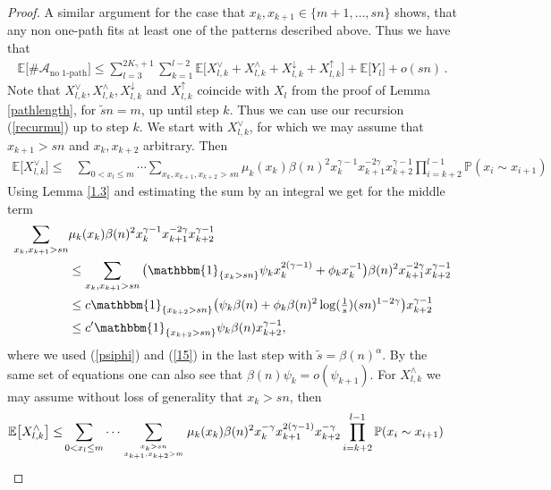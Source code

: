 \documentclass[12pt,a4paper]{article}
\numberwithin{equation}{section}
\begin{document}
\begin{proof}
    A similar argument for the case that $x_k,x_{k+1}\in\{m+1,\dots,sn\}$ shows, that any non one-path fits at least one of the patterns described above. Thus we have that 
    \begin{align}\label{anop}
       \mathbb E\big[ \#\mathcal A_{\text{no 1-path}}\big] \le \sum_{l=3}^{2K_\gamma+1}\sum_{k=1}^{l-2}\mathbb E\big[X_{l,k}^{\vee}+X_{l,k}^{\wedge}+X_{l,k}^{\downarrow}+X_{l,k}^{\uparrow}\big]+\mathbb E\big[Y_l\big]+o(sn)\,.
    \end{align}
    Note that $X_{l,k}^{\vee},X_{l,k}^{\wedge},X_{l,k}^{\downarrow}$ and $X_{l,k}^{\uparrow}$ coincide with $X_l$ from the proof of Lemma \ref{pathlength}, for $\tilde sn=m$, up until step $k$.  
    Thus we can use our recursion (\ref{recurmu}) up to step $k$. We start with $X_{l,k}^{\vee}$, for which we may assume that $x_{k+1}>sn$ and $x_k,x_{k+2}$ arbitrary. Then
    \begin{align*}
       \mathbb E\big[X_{l,k}^{\vee}\big]\le &\sum_{0<x_l\le m} \cdots \sum_{x_k,x_{k+1},x_{k+2}>sn} \mu_k(x_k)\beta(n)^2x_k^{\gamma-1}x_{k+1}^{-2\gamma}x_{k+2}^{\gamma-1}\prod_{i=k+2}^{l-1} \mathbb P (x_i\sim x_{i+1})
    \end{align*}
    Using Lemma \ref{1.3} and estimating the sum by an integral we get for the middle term
    \begin{align*}
        \sum_{x_k,x_{k+1}>sn} & \mu_k(x_k)\beta(n)^2x_k^{\gamma-1}x_{k+1}^{-2\gamma}x_{k+2}^{\gamma-1}
        \\ & \le  \sum_{x_k,x_{k+1}>sn} \big(\mathbbm{1}_{\{x_k>sn\}}\psi_kx_k^{2(\gamma-1)}+\phi_kx_k^{-1}\big)\beta(n)^2x_{k+1}^{-2\gamma}x_{k+2}^{\gamma-1}
        \\ & \le c\mathbbm{1}_{\{x_{k+2}>sn\}}\big( \psi_k \beta(n)+\phi_k \beta(n)^2\log(\tfrac1s)(sn)^{1-2\gamma}\big)x_{k+2}^{\gamma-1}
         \\ & \le    c'\mathbbm{1}_{\{x_{k+2}>sn\}} \psi_{k} \beta(n) x_{k+2}^{\gamma-1},
    \end{align*}
    where we used (\ref{psiphi}) and (\ref{15}) in the last step with $\tilde s=\beta(n)^\alpha$. By the same set of equations one can also see that $\beta(n)\psi_k=o(\psi_{k+1})$.
    For $X_{l,k}^{\wedge}$ we may assume without loss of generality that $x_k>sn$, then
    \begin{align*}
        \mathbb E\big[X_{l,k}^{\wedge}\big]\le &\sum_{0<x_l\le m} \cdots \sum_{x_k>sn\atop x_{k+1},x_{k+2}>m} \mu_k(x_k)\beta(n)^2x_k^{-\gamma}x_{k+1}^{2(\gamma-1)}x_{k+2}^{-\gamma}\prod_{i=k+2}^{l-1} \mathbb P (x_i\sim x_{i+1})

\end{align*}
\end{proof}
\end{document}
